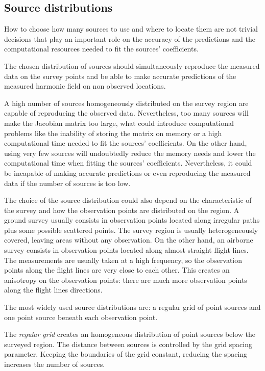 \documentclass[twocolumn]{article}
\begin{document}
\subsection{Source distributions}
\label{sec:source-distribution}

How to choose how many sources to use and where to locate them are not
trivial decisions that play an important role on the accuracy of the
predictions and the computational resources needed to fit the sources'
coefficients.

The chosen distribution of sources should simultaneously reproduce the measured
data on the survey points and be able to make accurate predictions of the
measured harmonic field on non observed locations.

A high number of sources homogeneously distributed on the survey region are
capable of reproducing the observed data. Nevertheless, too many sources will
make the Jacobian matrix too large, what could introduce computational problems
like the inability of storing the matrix on memory or a high computational time
needed to fit the sources' coefficients.
On the other hand, using very few sources will undoubtedly reduce the memory
needs and lower the computational time when fitting the sources' coefficients.
Nevertheless, it could be incapable of making accurate predictions or even
reproducing the measured data if the number of sources is too low.

The choice of the source distribution could also depend on the characteristic
of the survey and how the observation points are distributed on the region.
A ground survey usually consists in observation points located along irregular
paths plus some possible scattered points.
The survey region is usually heterogeneously covered, leaving areas without any
observation.
On the other hand, an airborne survey consists in observation points located
along almost straight flight lines. The measurements are usually taken at
a high frequency, so the observation points along the flight lines are very
close to each other.
This creates an anisotropy on the observation points: there are much more
observation points along the flight lines directions.

The most widely used source distributions are: a regular grid of point sources
and one point source beneath each observation point.

The \emph{regular grid} creates an homogeneous distribution of point sources
below the surveyed region.
The distance between sources is controlled by the grid spacing parameter.
Keeping the boundaries of the grid constant, reducing the spacing increases the
number of sources.
\end{document}
